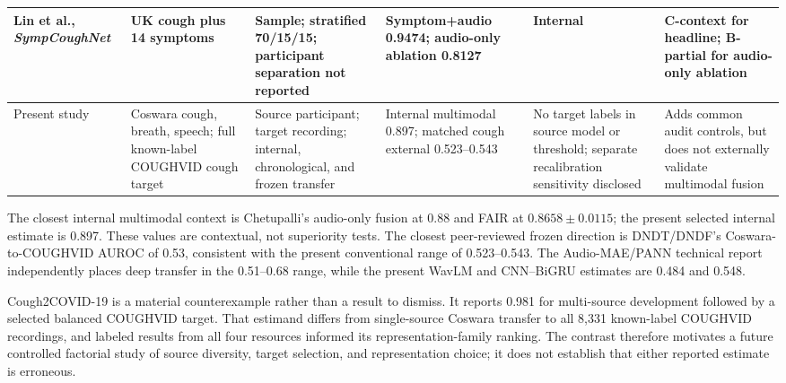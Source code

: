 \begin{longtable}{L{0.15\textwidth}L{0.14\textwidth}L{0.17\textwidth}L{0.12\textwidth}L{0.15\textwidth}L{0.17\textwidth}}
Lin et al., \emph{SympCoughNet} \cite{lin2025sympcoughnet} & UK cough plus 14 symptoms & Sample; stratified 70/15/15; participant separation not reported & Symptom+audio 0.9474; audio-only ablation 0.8127 & Internal & C-context for headline; B-partial for audio-only ablation \\
\midrule
Present study & Coswara cough, breath, speech; full known-label COUGHVID cough target & Source participant; target recording; internal, chronological, and frozen transfer & Internal multimodal 0.897; matched cough external 0.523--0.543 & No target labels in source model or threshold; separate recalibration sensitivity disclosed & Adds common audit controls, but does not externally validate multimodal fusion \\
\bottomrule
\end{longtable}
\endgroup

The closest internal multimodal context is Chetupalli's audio-only fusion at
0.88 and FAIR at $0.8658\pm0.0115$; the present selected internal estimate is
0.897. These values are contextual, not superiority tests. The closest
peer-reviewed frozen direction is DNDT/DNDF's Coswara-to-COUGHVID AUROC of
0.53, consistent with the present conventional range of 0.523--0.543. The
Audio-MAE/PANN technical report independently places deep transfer in the
0.51--0.68 range, while the present WavLM and CNN--BiGRU estimates are 0.484
and 0.548.

Cough2COVID-19 is a material counterexample rather than a result to dismiss. It
reports 0.981 for multi-source development followed by a selected balanced
COUGHVID target. That estimand differs from single-source Coswara transfer to
all 8,331 known-label COUGHVID recordings, and labeled results from all four
resources informed its representation-family ranking. The contrast therefore
motivates a future controlled factorial study of source diversity, target
selection, and representation choice; it does not establish that either
reported estimate is erroneous.
